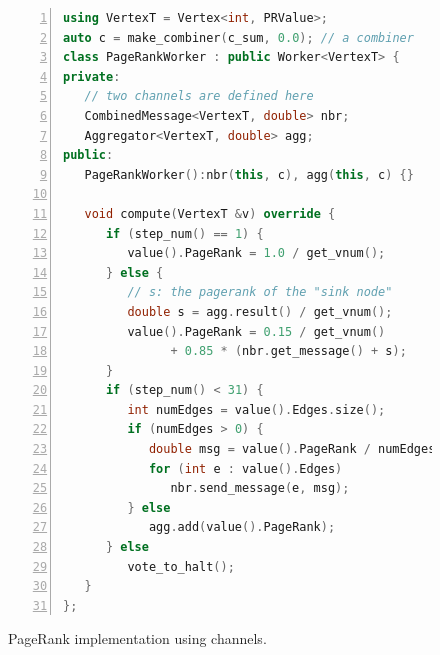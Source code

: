 \documentclass{sokendai_thesis} %
\begin{document}
\begin{figure}[t]
\begin{lstlisting}[basicstyle=\scriptsize\ttfamily,language=c++,morekeywords={override},
numbers=left,stepnumber=1,xleftmargin=2.5em,commentstyle=\color{xgreen}]
using VertexT = Vertex<int, PRValue>;
auto c = make_combiner(c_sum, 0.0); // a combiner
class PageRankWorker : public Worker<VertexT> {
private:
   // two channels are defined here
   CombinedMessage<VertexT, double> nbr;
   Aggregator<VertexT, double> agg;
public:
   PageRankWorker():nbr(this, c), agg(this, c) {}

   void compute(VertexT &v) override {
      if (step_num() == 1) {
         value().PageRank = 1.0 / get_vnum();
      } else {
         // s: the pagerank of the "sink node"
         double s = agg.result() / get_vnum();
         value().PageRank = 0.15 / get_vnum()
               + 0.85 * (nbr.get_message() + s);
      }
      if (step_num() < 31) {
         int numEdges = value().Edges.size();
         if (numEdges > 0) {
            double msg = value().PageRank / numEdges;
            for (int e : value().Edges)
               nbr.send_message(e, msg);
         } else
            agg.add(value().PageRank);
      } else
         vote_to_halt();
   }
};
\end{lstlisting}
\caption{PageRank implementation using channels.}
\label{fig:pagerank-channel}
\end{figure}
\end{document}
